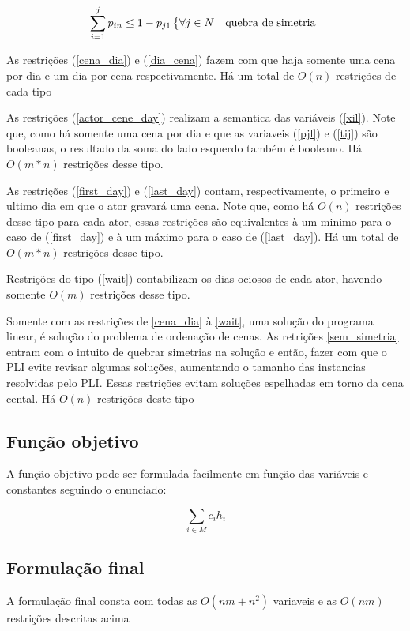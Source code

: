 \documentclass[a4paper,11pt,twoside]{article}
\begin{document}
\begin{equation}
  \sum_{i=1}^j p_{in} \leq 1 - p_{j1} \begin{dcases*} \forall j \in N & quebra de simetria \end{dcases*}
  \label{sem_simetria}
\end{equation}

As restrições (\ref{cena_dia}) e (\ref{dia_cena}) fazem com que haja somente uma
cena por dia e um dia por cena respectivamente. Há um total de $O(n)$ restrições
de cada tipo

As restrições (\ref{actor_cene_day}) realizam a semantica das variáveis (\ref{xil}).
Note que, como há somente uma cena por dia e que as variaveis (\ref{pjl}) e (\ref{tij})
são booleanas, o resultado da soma do lado esquerdo também é booleano. Há $O(m*n)$
restrições desse tipo.

As restrições (\ref{first_day}) e (\ref{last_day}) contam, respectivamente, o
primeiro e ultimo dia em que o ator gravará uma cena. Note que, como há $O(n)$
restrições desse tipo para cada ator, essas restrições são equivalentes à um
minimo para o caso de (\ref{first_day}) e à um máximo para o caso de (\ref{last_day}).
Há um total de $O(m*n)$ restrições desse tipo.

Restrições do tipo (\ref{wait}) contabilizam os dias ociosos de cada ator, havendo
somente $O(m)$ restrições desse tipo.

Somente com as restrições de \ref{cena_dia} à \ref{wait}, uma solução do programa
linear, é solução do problema de ordenação de cenas. As retrições \ref{sem_simetria}
entram com o intuito de quebrar simetrias na solução e então, fazer com que o PLI
evite revisar algumas soluções, aumentando o tamanho das instancias resolvidas pelo PLI.
Essas restrições evitam soluções espelhadas em torno da cena cental. Há $O(n)$ restrições
deste tipo

\subsection{Função objetivo}
A função objetivo pode ser formulada facilmente em função das variáveis e constantes
seguindo o enunciado:

\begin{equation}
  \sum_{i \in M} c_i h_i
\end{equation}

\subsection{Formulação final}
A formulação final consta com todas as $O(nm + n^2)$ variaveis e as $O(nm)$
restrições descritas acima
\end{document}
